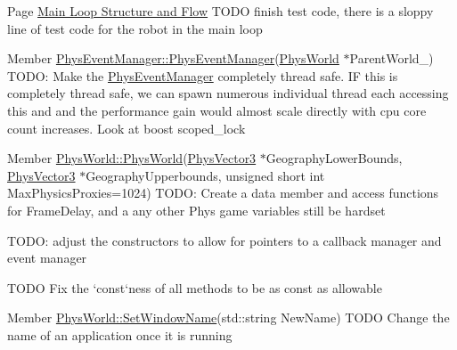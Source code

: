 \label{todo__todo000010}
\hypertarget{todo__todo000010}{}
 
\begin{DoxyDescription}
\item[Page \hyperlink{mainloop1}{Main Loop Structure and Flow} ]TODO finish test code, there is a sloppy line of test code for the robot in the main loop 
\end{DoxyDescription}

\label{todo__todo000005}
\hypertarget{todo__todo000005}{}
 
\begin{DoxyDescription}
\item[Member \hyperlink{classPhysEventManager_a1355f36d99de303cec6f3b27cadaa9ff}{PhysEventManager::PhysEventManager}(\hyperlink{classPhysWorld}{PhysWorld} $\ast$ParentWorld\_\-) ]TODO: Make the \hyperlink{classPhysEventManager}{PhysEventManager} completely thread safe. IF this is completely thread safe, we can spawn numerous individual thread each accessing this and and the performance gain would almost scale directly with cpu core count increases. Look at boost scoped\_\-lock 
\end{DoxyDescription}

\label{todo__todo000012}
\hypertarget{todo__todo000012}{}
 
\begin{DoxyDescription}
\item[Member \hyperlink{classPhysWorld_a3228c98369082139722d3c918d735e6c}{PhysWorld::PhysWorld}(\hyperlink{classPhysVector3}{PhysVector3} $\ast$GeographyLowerBounds, \hyperlink{classPhysVector3}{PhysVector3} $\ast$GeographyUpperbounds, unsigned short int MaxPhysicsProxies=1024) ]TODO: Create a data member and access functions for FrameDelay, and a any other Phys game variables still be hardset 

TODO: adjust the constructors to allow for pointers to a callback manager and event manager 

TODO Fix the `const`ness of all methods to be as const as allowable 
\end{DoxyDescription}

\label{todo__todo000011}
\hypertarget{todo__todo000011}{}
 
\begin{DoxyDescription}
\item[Member \hyperlink{classPhysWorld_adb5ba2b5a3140c5d7033d3180e3f7342}{PhysWorld::SetWindowName}(std::string NewName) ]TODO Change the name of an application once it is running 
\end{DoxyDescription}
